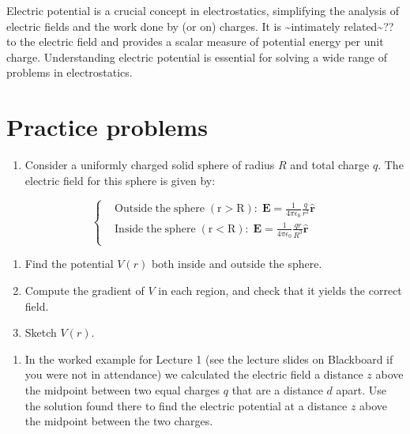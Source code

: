 \documentclass[
  letterpaper,
  DIV=11,
  numbers=noendperiod]{scrreprt}
\providecommand{\tightlist}{%
  \setlength{\itemsep}{0pt}\setlength{\parskip}{0pt}}\usepackage{longtable,booktabs,array}
\begin{document}
Electric potential is a crucial concept in electrostatics, simplifying
the analysis of electric fields and the work done by (or on) charges. It
is \textasciitilde intimately related\textasciitilde?? to the electric
field and provides a scalar measure of potential energy per unit charge.
Understanding electric potential is essential for solving a wide range
of problems in electrostatics.

\section{Practice problems}\label{practice-problems-1}

\begin{enumerate}
\def\labelenumi{\arabic{enumi})}
\tightlist
\item
  Consider a uniformly charged solid sphere of radius \(R\) and total
  charge \(q\). The electric field for this sphere is given by:
\end{enumerate}

\[
\left\{
    \begin{aligned}
         & \mathrm{Outside \; the \; sphere \; (r > R):} \; \mathrm{\mathbf{E}}= \frac{1}{4\pi\epsilon_0} \frac{q}{r^2} \hat{\mathrm{\mathbf{r}}}  \\
         & \mathrm{Inside \; the \; sphere \; (r < R):} \; \mathrm{\mathbf{E}}= \frac{1}{4\pi\epsilon_0} \frac{qr}{R^3} \hat{\mathrm{\mathbf{r}}} \\
    \end{aligned}
\right.
\]

\begin{enumerate}
\def\labelenumi{(\alph{enumi})}
\tightlist
\item
  Find the potential \(V(r)\) both inside and outside the sphere.
\item
  Compute the gradient of \(V\) in each region, and check that it yields
  the correct field.
\item
  Sketch \(V(r)\).
\end{enumerate}

\begin{enumerate}
\def\labelenumi{\arabic{enumi})}
\setcounter{enumi}{1}
\tightlist
\item
  In the worked example for Lecture 1 (see the lecture slides on
  Blackboard if you were not in attendance) we calculated the electric
  field a distance \(z\) above the midpoint between two equal charges
  \(q\) that are a distance \(d\) apart. Use the solution found there to
  find the electric potential at a distance \(z\) above the midpoint
  between the two charges.
\end{enumerate}
\end{document}
